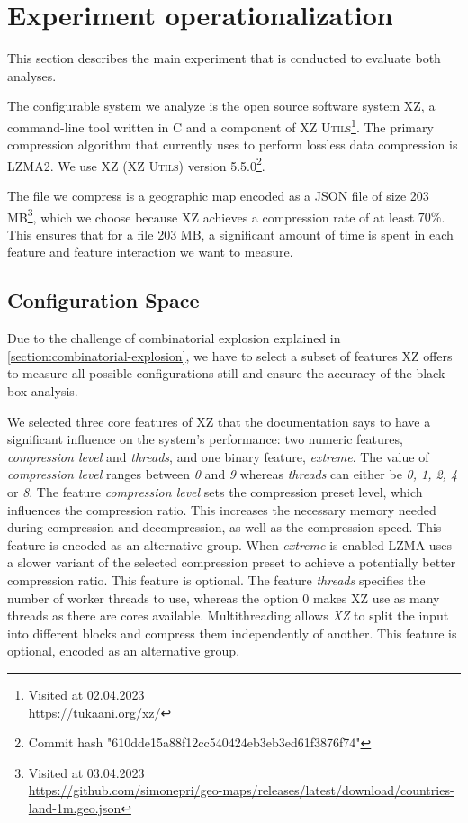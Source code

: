 \section{Experiment operationalization}\label{ch:Research-setup}
This section describes the main experiment that is conducted to evaluate both analyses.

The configurable system we analyze is the open source software system \textsc{XZ}, a command-line tool written in \textsc{C} and a component of
\textsc{XZ Utils}\footnote{Visited at 02.04.2023\\ \url{https://tukaani.org/xz/}}.  
The primary compression algorithm that  currently uses to perform lossless data compression is LZMA2.
We use \textsc{XZ} \textsc{(XZ Utils)} version 5.5.0\footnote{Commit hash "610dde15a88f12cc540424eb3eb3ed61f3876f74"}.

The file we compress is a geographic map encoded as a \textsc{JSON} file of size 203 MB\footnote{Visited at 03.04.2023\\ \url{https://github.com/simonepri/geo-maps/releases/latest/download/countries-land-1m.geo.json}},
which we choose because \textsc{XZ} achieves a compression rate of at least $70\%$. 
This ensures that for a file 203 MB, a significant amount of time is spent in each feature and feature interaction we want to measure.

\subsection{Configuration Space}
Due to the challenge of combinatorial explosion explained in \autoref{section:combinatorial-explosion}, 
we have to select a subset of features \textsc{XZ} offers to measure all possible configurations still 
and ensure the accuracy of the black-box analysis. 


We selected three core features of \textsc{XZ} that the documentation says to have a significant influence on the system's performance: 
two numeric features, \emph{compression level} and \emph{threads}, and one binary feature, \emph{extreme}. 
The value of \emph{compression level} ranges between \emph{0} and \emph{9} whereas \emph{threads} can either be \emph{0, 1, 2, 4} or \emph{8}. 
The feature \emph{compression level} sets the compression preset level, which influences the compression ratio.
This increases the necessary memory needed during compression and decompression, as well as the compression speed. 
This feature is encoded as an alternative group.
When \emph{extreme} is enabled \textsc{LZMA} uses a slower variant of the selected compression preset to achieve a potentially better compression ratio.
This feature is optional.
The feature \emph{threads} specifies the number of worker threads to use, whereas the option $0$ makes \textsc{XZ}  use as many threads as there are cores available.
Multithreading allows \emph{XZ} to split the input into different blocks and compress them independently of another.
This feature is optional, encoded as an alternative group.

